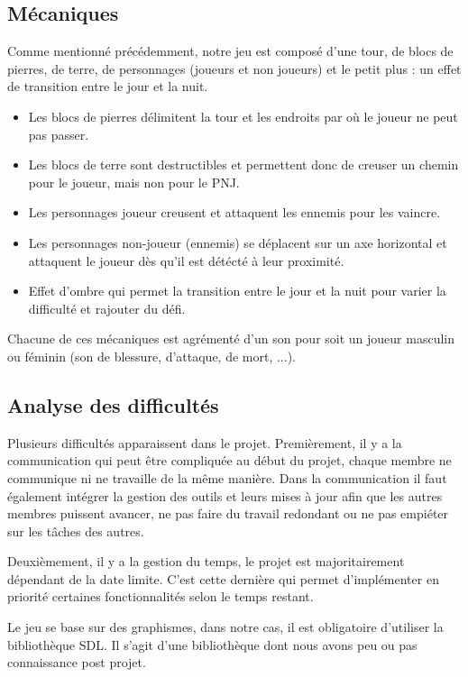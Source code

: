\documentclass[a4paper,12pt]{article}
\begin{document}
\subsection{Mécaniques}
Comme mentionné précédemment, notre jeu est composé d'une tour, de blocs de pierres, de terre, de personnages (joueurs et non joueurs) et le petit plus : un effet de transition entre le jour et la nuit.
\begin{itemize}
	\item Les blocs de pierres délimitent la tour et les endroits par où le joueur ne peut pas passer.
	\item Les blocs de terre sont destructibles et permettent donc de creuser un chemin pour le joueur, mais non pour le PNJ.
	\item Les personnages joueur creusent et attaquent les ennemis pour les vaincre.
	\item Les personnages non-joueur (ennemis) se déplacent sur un axe horizontal et attaquent le joueur dès qu'il est détécté à leur proximité.
	\item Effet d'ombre qui permet la transition entre le jour et la nuit pour varier la difficulté et rajouter du défi.
\end{itemize}

Chacune de ces mécaniques est agrémenté d'un son pour soit un joueur masculin ou féminin (son de blessure, d'attaque, de mort, ...).


\subsection{Analyse des difficultés}
Plusieurs difficultés apparaissent dans le projet. 
Premièrement, il y a la communication qui peut être compliquée au début du projet, chaque membre ne communique ni ne travaille de la même manière. Dans la communication il faut également intégrer la gestion des outils et leurs mises à jour afin que les autres membres puissent avancer, ne pas faire du travail redondant ou ne pas empiéter sur les tâches des autres.

Deuxièmement, il y a la gestion du temps, le projet est majoritairement dépendant de la date limite. C’est cette dernière qui permet d’implémenter en priorité certaines fonctionnalités selon le temps restant.

Le jeu se base sur des graphismes, dans notre cas, il est obligatoire d’utiliser la bibliothèque SDL. Il s’agit d’une bibliothèque dont nous avons peu ou pas connaissance post projet.
\end{document}
